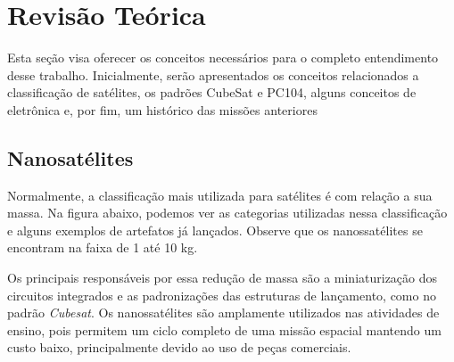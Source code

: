 \chapter{Revisão Teórica} \label{revisão}

Esta seção visa oferecer os conceitos necessários para o completo entendimento desse trabalho. Inicialmente, serão apresentados os conceitos relacionados a classificação de satélites, os padrões CubeSat e PC104, alguns conceitos de eletrônica e, por fim, um histórico das missões anteriores

\section{Nanosatélites}
Normalmente, a classificação mais utilizada para satélites é com relação a sua massa. Na figura abaixo, podemos ver as categorias utilizadas nessa classificação e alguns exemplos de artefatos já lançados. Observe que os nanossatélites se encontram na faixa de 1 até 10 kg.

\noindent
\begin{minipage}{\linewidth}
\label{mass_classification_fig}
\end{minipage}

 Os principais responsáveis por essa redução de massa são a miniaturização dos circuitos integrados e as padronizações das estruturas de lançamento, como no padrão \textit{Cubesat}. Os nanossatélites são amplamente utilizados nas atividades de ensino, pois permitem um ciclo completo de uma missão espacial mantendo um custo baixo, principalmente devido ao uso de peças comerciais.\cite{barnhart_ref}


